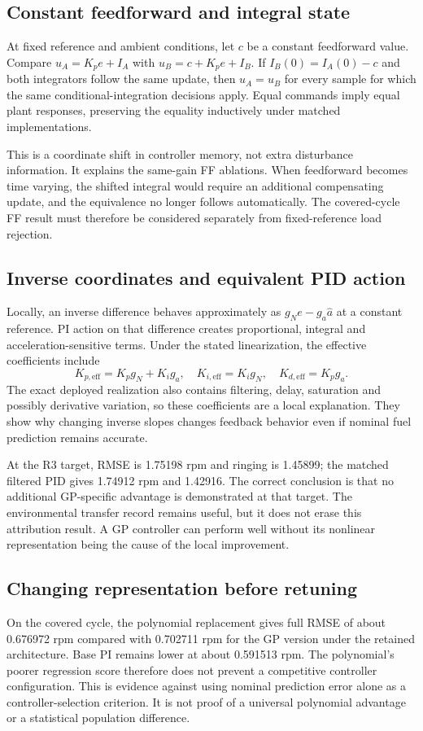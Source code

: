 \subsection{Constant feedforward and integral state}
At fixed reference and ambient conditions, let $c$ be a constant feedforward value. Compare $u_A=K_pe+I_A$ with $u_B=c+K_pe+I_B$. If $I_B(0)=I_A(0)-c$ and both integrators follow the same update, then $u_A=u_B$ for every sample for which the same conditional-integration decisions apply. Equal commands imply equal plant responses, preserving the equality inductively under matched implementations.

This is a coordinate shift in controller memory, not extra disturbance information. It explains the same-gain FF ablations. When feedforward becomes time varying, the shifted integral would require an additional compensating update, and the equivalence no longer follows automatically. The covered-cycle FF result must therefore be considered separately from fixed-reference load rejection.

\subsection{Inverse coordinates and equivalent PID action}
Locally, an inverse difference behaves approximately as $g_N e-g_a\hat a$ at a constant reference. PI action on that difference creates proportional, integral and acceleration-sensitive terms. Under the stated linearization, the effective coefficients include
\begin{equation}
K_{p,\mathrm{eff}}=K_p g_N+K_i g_a,\quad
K_{i,\mathrm{eff}}=K_i g_N,\quad
K_{d,\mathrm{eff}}=K_p g_a.
\end{equation}
The exact deployed realization also contains filtering, delay, saturation and possibly derivative variation, so these coefficients are a local explanation. They show why changing inverse slopes changes feedback behavior even if nominal fuel prediction remains accurate.

At the R3 target, RMSE is 1.75198 rpm and ringing is 1.45899; the matched filtered PID gives 1.74912 rpm and 1.42916. The correct conclusion is that no additional GP-specific advantage is demonstrated at that target. The environmental transfer record remains useful, but it does not erase this attribution result. A GP controller can perform well without its nonlinear representation being the cause of the local improvement.

\subsection{Changing representation before retuning}
On the covered cycle, the polynomial replacement gives full RMSE of about 0.676972 rpm compared with 0.702711 rpm for the GP version under the retained architecture. Base PI remains lower at about 0.591513 rpm. The polynomial's poorer regression score therefore does not prevent a competitive controller configuration. This is evidence against using nominal prediction error alone as a controller-selection criterion. It is not proof of a universal polynomial advantage or a statistical population difference.

